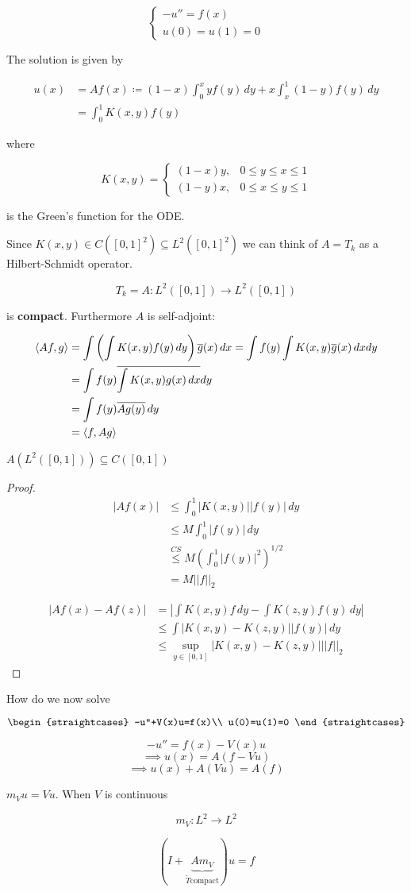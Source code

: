 \[\begin{cases}
    -u''=f(x)\\
    u(0)=u(1)=0
\end{cases}\]

The solution is given by 

\begin{align*}
    u(x)&=A f(x)\coloneqq (1-x)\int_0^x y f(y)\,dy+x\int_x^1 (1-y) f(y)\,dy\\
    &=\int_0^1 K(x,y)f(y)
\end{align*}

where 

\[K(x,y)=\begin{cases}
    (1-x)y, &0\leq y\leq x\leq 1\\
    (1-y)x, &0\leq x\leq y\leq 1
\end{cases}\]

is the Green's function for the ODE.

Since $K(x,y)\in C([0,1]^2)\subseteq L^2([0,1]^2)$ we can think of $A=T_k$ as a Hilbert-Schmidt operator.

\[T_k=A:L^2([0,1])\to L^2([0,1])\]

is \textbf{compact}. Furthermore $A$ is self-adjoint:

\begin{align*}\left\langle Af,g\right\rangle&=\int\left(\int K(x,y)f(y)\,dy\right)\overline{g}(x)\,dx=\int f(y)\int K(x,y)\overline{g}(x)\,dxdy\\
&=\int f(y)\overline{\int K(x,y)g(x)\,dx}dy\\
&=\int f(y)\overline{A g(y)}\,dy\\
&=\left\langle f,Ag\right\rangle\end{align*}

\begin{fproposition}
    $A(L^2([0,1]))\subseteq C([0,1])$
\end{fproposition}

\begin{proof}
    \begin{align*}
        |A f(x)|&\leq \int_0^1 |K(x,y)||f(y)|\,dy\\
        &\leq M\int_0^1 |f(y)|\,dy\\
        &\overset{CS}{\leq} M\left(\int_0^1 |f(y)|^2\right)^{1/2}\\
        &=M||f||_2
    \end{align*}

    \begin{align*}
        |Af(x)-Af(z)|&=\left|\int K(x,y)f\,dy-\int K(z,y)f(y)\,dy\right|\\
        &\leq \int |K(x,y)-K(z,y)||f(y)|\,dy\\
        &\leq \sup_{y\in[0,1]} |K(x,y)-K(z,y)|||f||_{2}
    \end{align*}
\end{proof}

How do we now solve 

\[\begin{straightcases}
    -u''+V(x)u=f(x)\\
    u(0)=u(1)=0
\end{straightcases}\]

\[-u''=f(x)-V(x)u\]
\[\implies u(x)=A(f-Vu)\]
\[\implies u(x)+A(Vu)=A(f)\]

$m_V u= Vu$. When $V$ is continuous

\[m_V:L^2\to L^2\]

\[(I+\underbrace{Am_V}_{\tilde T \text{compact}})u=f\]